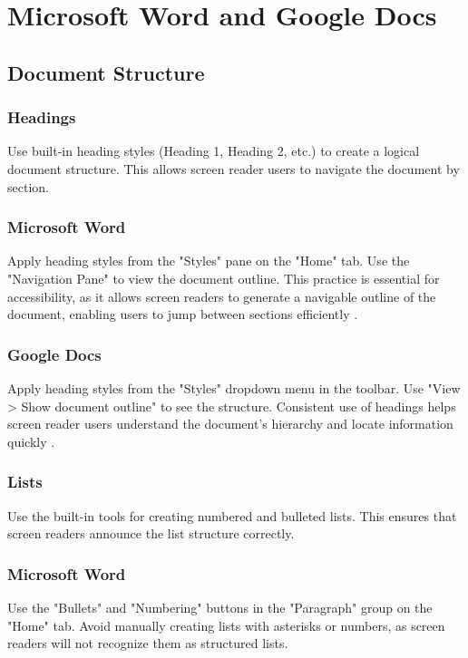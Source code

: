 \section{Microsoft Word and Google Docs}\label{ch15:sec:word-docs}

\subsection{Document Structure}\label{ch15:ssec:doc-structure}

\subsubsection{Headings}\label{ch15:sssec:headings}
Use built-in heading styles (Heading 1, Heading 2, etc.) to create a logical document structure. This allows screen reader users to navigate the document by section.

\subsubsection{Microsoft Word}\label{ch15:sssec:word-headings}
Apply heading styles from the "Styles" pane on the "Home" tab. Use the "Navigation Pane" to view the document outline. This practice is essential for accessibility, as it allows screen readers to generate a navigable outline of the document, enabling users to jump between sections efficiently \supercite{MicrosoftAccessibility}.

\subsubsection{Google Docs}\label{ch15:sssec:docs-headings}
Apply heading styles from the "Styles" dropdown menu in the toolbar. Use "View > Show document outline" to see the structure. Consistent use of headings helps screen reader users understand the document's hierarchy and locate information quickly \supercite{GoogleAccessibility}.

\subsubsection{Lists}\label{ch15:sssec:lists}
Use the built-in tools for creating numbered and bulleted lists. This ensures that screen readers announce the list structure correctly.

\subsubsection{Microsoft Word}\label{ch15:sssec:word-lists}
Use the "Bullets" and "Numbering" buttons in the "Paragraph" group on the "Home" tab. Avoid manually creating lists with asterisks or numbers, as screen readers will not recognize them as structured lists.


